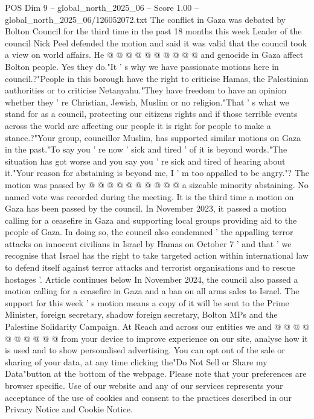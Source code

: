 \begin{textsample}{POS Dim 9 – global\_north\_2025\_06 – Score 1.00 – global\_north\_2025\_06/126052072.txt}
The conflict in Gaza was debated by Bolton Council for the third time in the past 18 months this week Leader of the council Nick Peel defended the motion and said it was valid that the council took a view on world affairs.
He @ @ @ @ @ @ @ @ @ @ and genocide in Gaza affect Bolton people.
Yes they do."It ' s why we have passionate motions here in council.?"People in this borough have the right to criticise Hamas, the Palestinian authorities or to criticise Netanyahu."They have freedom to have an opinion whether they ' re Christian, Jewish, Muslim or no religion."That ' s what we stand for as a council, protecting our citizens rights and if those terrible events across the world are affecting our people it is right for people to make a stance.?"Your group, councillor Muslim, has supported similar motions on Gaza in the past."To say you ' re now ' sick and tired ' of it is beyond words."The situation has got worse and you say you ' re sick and tired of hearing about it."Your reason for abstaining is beyond me, I ' m too appalled to be angry."?
The motion was passed by @ @ @ @ @ @ @ @ @ @ a sizeable minority abstaining.
No named vote was recorded during the meeting.
It is the third time a motion on Gaza has been passed by the council.
In November 2023, it passed a motion calling for a ceasefire in Gaza and supporting local groups providing aid to the people of Gaza.
In doing so, the council also condemned ' the appalling terror attacks on innocent civilians in Israel by Hamas on October 7 ' and that ' we recognise that Israel has the right to take targeted action within international law to defend itself against terror attacks and terrorist organisations and to rescue hostages '.
Article continues below In November 2024, the council also passed a motion calling for a ceasefire in Gaza and a ban on all arms sales to Israel.
The support for this week ' s motion means a copy of it will be sent to the Prime Minister, foreign secretary, shadow foreign secretary, Bolton MPs and the Palestine Solidarity Campaign.
At Reach and across our entities we and @ @ @ @ @ @ @ @ @ @ from your device to improve experience on our site, analyse how it is used and to show personalised advertising.
You can opt out of the sale or sharing of your data, at any time clicking the"Do Not Sell or Share my Data"button at the bottom of the webpage.
Please note that your preferences are browser specific.
Use of our website and any of our services represents your acceptance of the use of cookies and consent to the practices described in our Privacy Notice and Cookie Notice.

\end{textsample}
